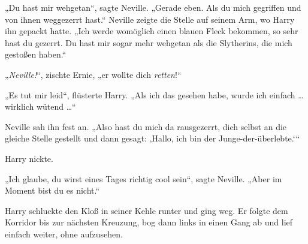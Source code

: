 „Du hast mir wehgetan“, sagte Neville.
„Gerade eben. Als du mich gegriffen und von ihnen weggezerrt hast.“ Neville zeigte die Stelle auf seinem Arm, wo Harry ihn gepackt hatte.
„Ich werde womöglich einen blauen Fleck bekommen, so sehr hast du gezerrt. Du hast mir sogar mehr wehgetan als die Slytherins, die mich gestoßen haben.“

„\emph{Neville!}“, zischte Ernie, „er wollte dich \emph{retten}!“

„Es tut mir leid“, flüsterte Harry.
„Als ich das gesehen habe, wurde ich einfach … wirklich wütend …“

Neville sah ihn fest an.
„Also hast du mich da rausgezerrt, dich selbst an die gleiche Stelle gestellt und dann gesagt: ‚Hallo, ich bin der Junge-der-überlebte.‘“

Harry nickte.

„Ich glaube, du wirst eines Tages richtig cool sein“, sagte Neville.
„Aber im Moment bist du es nicht.“

Harry schluckte den Kloß in seiner Kehle runter und ging weg. Er folgte dem Korridor bis zur nächsten Kreuzung, bog dann links in einen Gang ab und lief einfach weiter, ohne aufzusehen.

